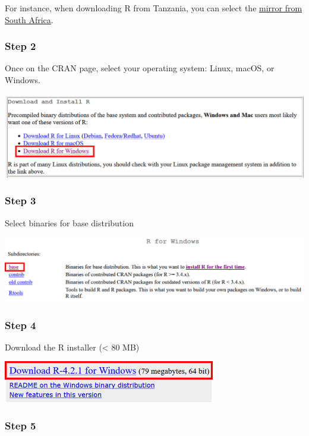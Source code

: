 \documentclass[
  letterpaper,
  DIV=11,
  numbers=noendperiod,
  oneside]{scrreprt}
\begin{document}
For instance, when downloading R from Tanzania, you can select the
\href{https://cran.mirror.ac.za/}{mirror from South Africa}.

\hypertarget{step-2-1}{%
\subsubsection{Step 2}\label{step-2-1}}

Once on the CRAN page, select your operating system: Linux, macOS, or
Windows.

\includegraphics{./images/paste-23A4B16E.png}

\hypertarget{step-3-1}{%
\subsubsection{Step 3}\label{step-3-1}}

Select binaries for base distribution

\includegraphics{./images/paste-0739A4C1.png}

\hypertarget{step-4}{%
\subsubsection{Step 4}\label{step-4}}

Download the R installer (\textless{} 80 MB)

\includegraphics[width=3.64583in,height=\textheight]{./images/paste-9624855F.png}

\hypertarget{step-5}{%
\subsubsection{Step 5}\label{step-5}}
\end{document}
